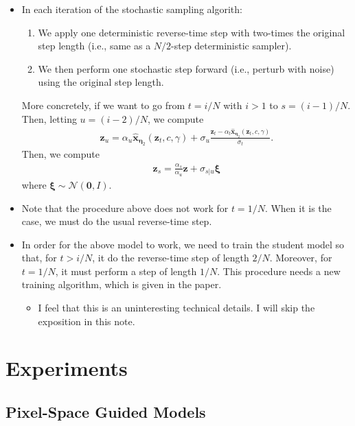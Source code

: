 \documentclass[10pt]{article}
\newcommand{\ve}[1]{\mathbf{#1}}
\newcommand{\ves}[1]{\boldsymbol{#1}}
\newcommand{\mcal}[1]{\mathcal{#1}}
\newcommand{\z}{\mathbf{z}}
\begin{document}
\begin{itemize}
  \item In each iteration of the stochastic sampling algorith:
  \begin{enumerate}
    \item We apply one deterministic reverse-time step with two-times the original step length (i.e., same as a $N/2$-step deterministic sampler).
    \item We then perform one stochastic step forward (i.e., perturb with noise) using the original step length.
  \end{enumerate}
  More concretely, if we want to go from $t = i/N$ with $i > 1$ to $s = (i-1)/N$. Then, letting $u = (i-2)/N$, we compute
  \begin{align*}
    \ve{z}_u = \alpha_u \hat{\ve{x}}_{\ves{\eta}_2}(\ve{z}_t, c, \gamma) + \sigma_u \frac{\ve{z}_t - \alpha_t \hat{\ve{x}}_{\ves{\eta}_2}(\ve{z}_t, c, \gamma)}{\sigma_t}.
  \end{align*}
  Then, we compute
  \begin{align*}
    \ve{z}_s = \frac{\alpha_s}{\alpha_u} \ve{\z} + \sigma_{s|u} \ves{\xi}
  \end{align*}
  where $\ves{\xi} \sim \mcal{N}(\ve{0},I)$.

  \item Note that the procedure above does not work for $t = 1/N$. When it is the case, we must do the usual reverse-time step.
  
  \item In order for the above model to work, we need to train the student model so that, for $t > i/N$, it do the reverse-time step of length $2/N$. Moreover, for $t = 1/N$, it must perform a step of length $1/N$. This procedure needs a new training algorithm, which is given in the paper.
  \begin{itemize}
    \item I feel that this is an uninteresting technical details. I will skip the exposition in this note.
  \end{itemize}
\end{itemize}

\section{Experiments}

\subsection{Pixel-Space Guided Models}
\end{document}
